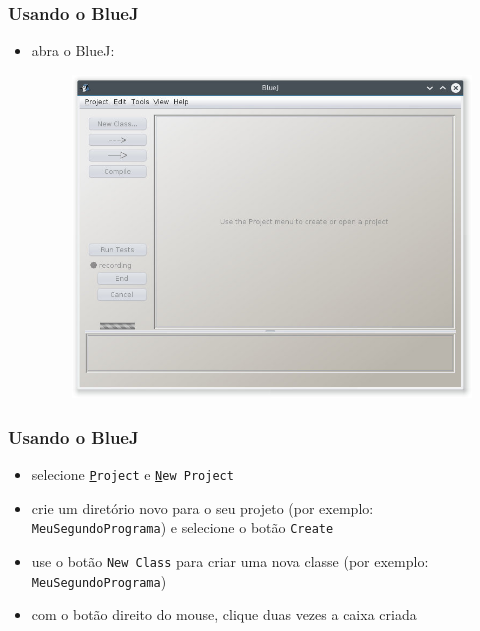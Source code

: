 \documentclass[aspectratio=169]{beamer}
\begin{document}
\begin{frame}\frametitle{Usando o BlueJ}
\begin{itemize}
	\item abra o BlueJ:
	\begin{figure}[h]
		\centering
		\includegraphics[height=0.65\paperheight]{pucrs-ep-fprog-unidade_01-introducao-laminas-bluej.jpg}
	\end{figure}
\end{itemize}
\end{frame}

\begin{frame}\frametitle{Usando o BlueJ}
\begin{itemize}
	\item selecione \texttt{\underline{P}roject} e \texttt{\underline{N}ew Project}
	\item crie um diretório novo para o seu projeto (por exemplo: \texttt{MeuSegundoPrograma}) e selecione o botão \texttt{Create}
	\item use o botão \texttt{New Class} para criar uma nova classe (por exemplo: \texttt{MeuSegundoPrograma})
	\item com o botão direito do mouse, clique duas vezes a caixa criada
\end{itemize}
\end{frame}
\end{document}
